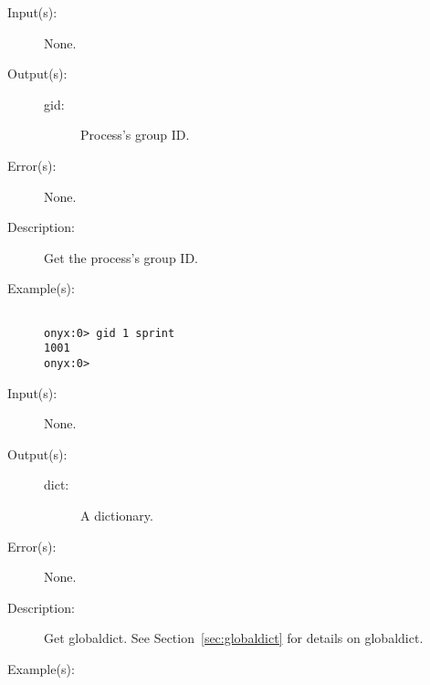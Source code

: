 \begin{description}
\begin{description}
\begin{verbatim}
		\end{verbatim}
	\end{description}
\label{systemdict:gid}
\item[{\onyxop{--}{gid}{gid}}: ]
	\begin{description}\item[]
	\item[Input(s): ] None.
	\item[Output(s): ]
		\begin{description}\item[]
		\item[gid: ]
			Process's group ID.
		\end{description}
	\item[Error(s): ] None.
	\item[Description: ]
		Get the process's group ID.
	\item[Example(s): ]\begin{verbatim}

onyx:0> gid 1 sprint
1001
onyx:0>
		\end{verbatim}
	\end{description}
\label{systemdict:globaldict}
\item[{\onyxop{--}{globaldict}{dict}}: ]
	\begin{description}\item[]
	\item[Input(s): ] None.
	\item[Output(s): ]
		\begin{description}\item[]
		\item[dict: ]
			A dictionary.
		\end{description}
	\item[Error(s): ] None.
	\item[Description: ]
		Get globaldict.  See Section~\ref{sec:globaldict} for details on
		globaldict.
	\item[Example(s): ]\begin{verbatim}


\end{verbatim}
\end{description}
\end{description}
